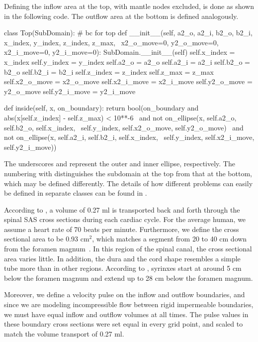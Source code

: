 Defining the inflow area at the top, with mantle nodes excluded, is
done as shown in the following code. The outflow area at the bottom is
defined analogously.

\begin{python}
class Top(SubDomain): # bc for top
	def __init__(self, a2_o, a2_i, b2_o, b2_i, x_index, y_index, z_index, z_max, \
	             x2_o_move=0, y2_o_move=0, x2_i_move=0, y2_i_move=0):
		SubDomain.__init__(self)
		self.x_index = x_index
		self.y_index = y_index
		self.a2_o = a2_o
		self.a2_i = a2_i
		self.b2_o = b2_o
		self.b2_i = b2_i
		self.z_index = z_index
		self.z_max = z_max
		self.x2_o_move = x2_o_move
		self.x2_i_move = x2_i_move
		self.y2_o_move = y2_o_move
		self.y2_i_move = y2_i_move

	def inside(self, x, on_boundary):
		return bool(on_boundary and abs(x[self.z_index] - self.z_max) < 10**-6 \
		            and not on_ellipse(x, self.a2_o, self.b2_o, self.x_index, \
		                               self.y_index, self.x2_o_move, self.y2_o_move) \
		            and not on_ellipse(x, self.a2_i, self.b2_i, self.x_index, \
		                               self.y_index, self.x2_i_move, self.y2_i_move))
\end{python}

The underscores \emp{o} and \emp{i} represent the outer and inner
ellipse, respectively. The numbering with \emp{2} distinguishes the
subdomain at the top from that at the bottom, which may be defined
differently. The details of how different problems can easily be
defined in separate classes can be found in
\emp{src/mesh\_definitions/}. %

According to \citet{GuptaSoellingerBoesigerEtAl2009}, a volume of 0.27
ml is transported back and forth through the spinal SAS cross sections
during each cardiac cycle. For the average human, we assume a heart
rate of 70 beats per minute. Furthermore, we define the cross
sectional area to be 0.93 $\mathrm{cm^2}$, which matches a segment
from 20 to 40 cm down from the foramen
magnum~\citep{LothYardimciAlperin2001}. In this region of the spinal
canal, the cross sectional area varies little. In addition, the dura
and the cord shape resembles a simple tube more than in other regions.
According to \citet{OldfieldMuraszkoShawkerEtAl1994}, syrinxes start
at around 5 cm below the foramen magnum and extend up to 28 cm below
the foramen magnum.

Moreover, we define a velocity pulse on the inflow and outflow
boundaries, and since we are modeling incompressible flow between
rigid impermeable boundaries, we must have equal inflow and outflow
volumes at all times. The pulse values in these boundary cross
sections were set equal in every grid point, and scaled to match the
volume transport of 0.27 ml.

